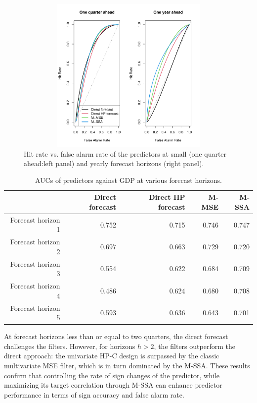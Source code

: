 \documentclass[a4paper]{article}
\begin{document}
\begin{figure}[H]\begin{center}\includegraphics[height=3in, width=5in]{./Figures/ROC_GDP_shift_1_4.pdf}\caption{Hit rate vs. false alarm rate of the predictors at small (one quarter ahead:left panel) and yearly forecast horizons (right panel).\label{ROC_GDP_shift_1_4}}\end{center}\end{figure}
\begin{table}[ht]
\centering
\begin{tabular}{rrrrr}
  \hline
 & Direct forecast & Direct HP forecast & M-MSE & M-SSA \\ 
  \hline
Forecast horizon 1 & 0.752 & 0.715 & 0.746 & 0.747 \\ 
  Forecast horizon 2 & 0.697 & 0.663 & 0.729 & 0.720 \\ 
  Forecast horizon 3 & 0.554 & 0.622 & 0.684 & 0.709 \\ 
  Forecast horizon 4 & 0.486 & 0.624 & 0.680 & 0.708 \\ 
  Forecast horizon 5 & 0.593 & 0.636 & 0.643 & 0.701 \\ 
   \hline
\end{tabular}
\caption{AUCs of predictors against GDP at various forecast horizons.} 
\label{p_val_wc5}
\end{table}At forecast horizons less than or equal to two quarters, the direct forecast challenges the filters. However, for horizons $h>2$, the filters outperform the direct approach: the univariate HP-C design is surpassed by the classic multivariate MSE filter, which is in turn dominated by the M-SSA. These results confirm that controlling the rate of sign changes of the predictor, while maximizing its target correlation through M-SSA can enhance predictor performance in terms of sign accuracy and false alarm rate.
\end{document}
